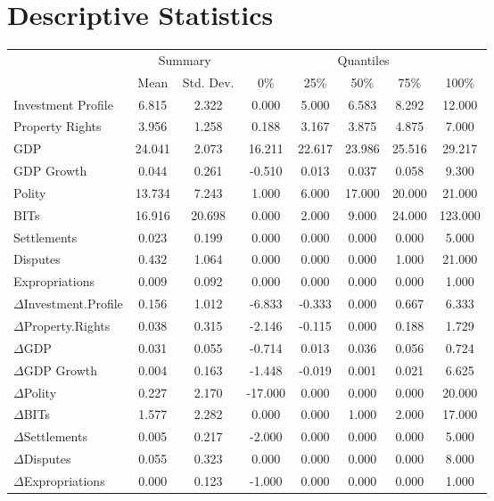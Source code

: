 \section{Descriptive Statistics}

\begin{table}[ht]
\centering
\begin{tabular}{lcc|ccccc}
  \hline\hline
  & \multicolumn{2}{c}{Summary} & \multicolumn{5}{c}{Quantiles}\\
 & Mean & Std. Dev. & 0\% & 25\% & 50\% & 75\% & 100\% \\ 
  \hline
Investment Profile & 6.815 & 2.322 & 0.000 & 5.000 & 6.583 & 8.292 & 12.000 \\ 
  Property Rights & 3.956 & 1.258 & 0.188 & 3.167 & 3.875 & 4.875 & 7.000 \\ 
  \hline
  GDP & 24.041 & 2.073 & 16.211 & 22.617 & 23.986 & 25.516 & 29.217 \\ 
  GDP Growth & 0.044 & 0.261 & -0.510 & 0.013 & 0.037 & 0.058 & 9.300 \\ 
  Polity & 13.734 & 7.243 & 1.000 & 6.000 & 17.000 & 20.000 & 21.000 \\
  BITs & 16.916 & 20.698 & 0.000 & 2.000 & 9.000 & 24.000 & 123.000 \\ 
  Settlements & 0.023 & 0.199 & 0.000 & 0.000 & 0.000 & 0.000 & 5.000 \\ 
  Disputes & 0.432 & 1.064 & 0.000 & 0.000 & 0.000 & 1.000 & 21.000 \\ 
  Expropriations & 0.009 & 0.092 & 0.000 & 0.000 & 0.000 & 0.000 & 1.000 \\ 
  \hline
  $\Delta$Investment.Profile & 0.156 & 1.012 & -6.833 & -0.333 & 0.000 & 0.667 & 6.333 \\ 
  $\Delta$Property.Rights & 0.038 & 0.315 & -2.146 & -0.115 & 0.000 & 0.188 & 1.729 \\ 
  $\Delta$GDP & 0.031 & 0.055 & -0.714 & 0.013 & 0.036 & 0.056 & 0.724 \\ 
  $\Delta$GDP Growth & 0.004 & 0.163 & -1.448 & -0.019 & 0.001 & 0.021 & 6.625 \\ 
  $\Delta$Polity & 0.227 & 2.170 & -17.000 & 0.000 & 0.000 & 0.000 & 20.000 \\
  $\Delta$BITs & 1.577 & 2.282 & 0.000 & 0.000 & 1.000 & 2.000 & 17.000 \\ 
  $\Delta$Settlements & 0.005 & 0.217 & -2.000 & 0.000 & 0.000 & 0.000 & 5.000 \\ 
  $\Delta$Disputes & 0.055 & 0.323 & 0.000 & 0.000 & 0.000 & 0.000 & 8.000 \\
  $\Delta$Expropriations & 0.000 & 0.123 & -1.000 & 0.000 & 0.000 & 0.000 & 1.000 \\ 
   \hline\hline
\end{tabular}
\end{table}

